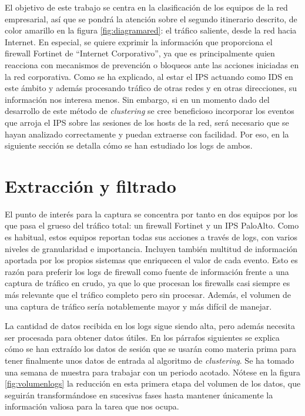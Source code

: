 El objetivo de este trabajo se centra en la clasificación de los equipos de la red empresarial, así que se pondrá la atención sobre el segundo itinerario descrito, de color amarillo en la figura \ref{fig:diagramared}: el tráfico saliente, desde la red hacia Internet.
En especial, se quiere exprimir la información que proporciona el firewall Fortinet de ``Internet Corporativo'', ya que es principalmente quien reacciona con mecanismos de prevención o bloqueos ante las acciones iniciadas en la red corporativa.
Como se ha explicado, al estar el IPS actuando como IDS en este ámbito y además procesando tráfico de otras redes y en otras direcciones, su información nos interesa menos.
Sin embargo, si en un momento dado del desarrollo de este método de \emph{clustering} se cree beneficioso incorporar los eventos que arroja el IPS sobre las sesiones de los hosts de la red,
será necesario que se hayan analizado correctamente y puedan extraerse con facilidad.
Por eso, en la siguiente sección se detalla cómo se han estudiado los logs de ambos.

\section{Extracción y filtrado}\label{sec:extraccionyfiltrado}

El punto de interés para la captura se concentra por tanto en dos equipos por los que pasa el grueso del tráfico total: un firewall Fortinet y un IPS PaloAlto.
Como es habitual, estos equipos reportan todas sus acciones a través de logs, con varios niveles de granularidad e importancia.
Incluyen también multitud de información aportada por los propios sistemas que enriquecen el valor de cada evento.
Esto es razón para preferir los logs de firewall como fuente de información frente a una captura de tráfico en crudo, ya que
lo que procesan los firewalls casi siempre es más relevante que el tráfico completo pero sin procesar.
Además, el volumen de una captura de tráfico sería notablemente mayor y más difícil de manejar.

La cantidad de datos recibida en los logs sigue siendo alta, pero además necesita ser procesada para obtener datos útiles.
En los párrafos siguientes se explica cómo se han extraído los datos de sesión que se usarán como materia prima para tener finalmente unos datos de entrada al algoritmo de \emph{clustering}.
Se ha tomado una semana de muestra para trabajar con un periodo acotado.
Nótese en la figura \ref{fig:volumenlogs} la reducción en esta primera etapa del volumen de los datos, que seguirán transformándose en sucesivas fases hasta mantener únicamente la información valiosa para la tarea que nos ocupa.


